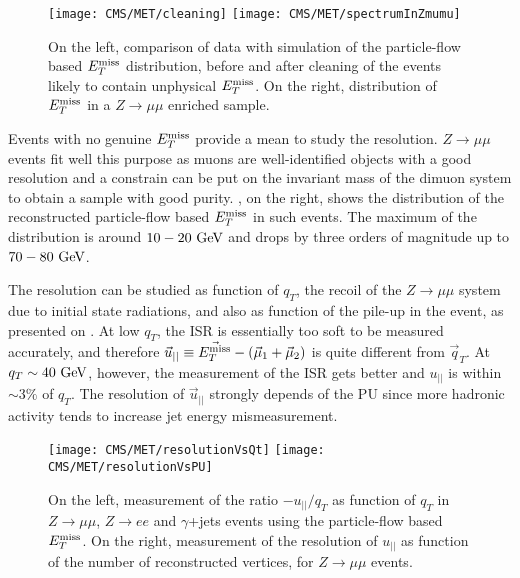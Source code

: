         \begin{figure}[h!]
            \centering
            \texttt{[image: CMS/MET/cleaning]}
            \texttt{[image: CMS/MET/spectrumInZmumu]}
            \caption{On the left, comparison of data with simulation of the
            particle-flow based $E_T^\text{miss}$ distribution, before and after cleaning of the events
            likely to contain unphysical $E_T^\text{miss}$. On the right, distribution of $E_T^\text{miss}$ in
            a $Z \rightarrow \mu\mu$ enriched sample.}
            \label{fig:METspectrum}
        \end{figure}

        Events with no genuine $E_T^\text{miss}$ provide a mean to study the resolution.
        $Z \rightarrow \mu\mu$ events fit well this purpose as muons are well-identified objects
        with a good resolution and a constrain can be put on the invariant mass of the
        dimuon system to obtain a sample with good purity. ,
        on the right, shows the distribution of the reconstructed particle-flow based
        $E_T^\text{miss}$ in such events. The maximum of the distribution is around $10-20~\text{GeV}$ and
        drops by three orders of magnitude up to $70-80~\text{GeV}$.

        The resolution can be studied as function of $q_T$, the recoil of the $Z \rightarrow \mu\mu$
        system due to initial state radiations, and also as function of the pile-up in the
        event, as presented on . At low $q_T$, the ISR is
        essentially too soft to be measured accurately, and therefore $\vec{u}_{||}
        \equiv \vec{E_T^\text{miss}} - (\vec{\mu}_1 + \vec{\mu}_2)$ is quite different from $\vec{q}_T$.
        At $q_T \sim 40~\text{GeV}$, however, the measurement of the ISR gets better and $u_{||}$
        is within $\sim 3\%$ of $q_T$. The resolution of $\vec{u}_{||}$ strongly depends
        of the PU since more hadronic activity tends to increase jet energy mismeasurement.

        \begin{figure}[h!]
            \centering
            \texttt{[image: CMS/MET/resolutionVsQt]}
            \texttt{[image: CMS/MET/resolutionVsPU]}
            \caption{On the left, measurement of the ratio $-u_{||}/q_T$ as function of $q_T$
            in $Z\rightarrow\mu\mu$, $Z\rightarrow e e$ and $\gamma$+jets events using
            the particle-flow based $E_T^\text{miss}$. On the right, measurement of the resolution of
            $u_{||}$ as function of the number of reconstructed vertices, for
            $Z\rightarrow\mu\mu$ events.}
            \label{fig:METresolution}
        \end{figure}


